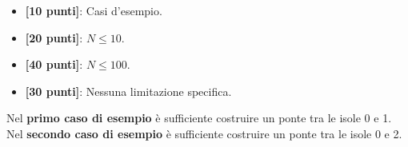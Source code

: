 \begin{itemize}[nolistsep,itemsep=2mm]
  \item \textbf{ [10 punti]}: Casi d'esempio.
  \item \textbf{ [20 punti]}: $N \leq 10$.
  \item \textbf{ [40 punti]}: $N \leq 100$.
  \item \textbf{ [30 punti]}: Nessuna limitazione specifica.
\end{itemize}

\Examples
\begin{example}
%
\end{example}
\begin{example}
%
\end{example}


\Explanation
Nel \textbf{primo caso di esempio} è sufficiente costruire un ponte tra le isole 0 e 1.\\[2mm]
Nel \textbf{secondo caso di esempio} è sufficiente costruire un ponte tra le isole 0 e 2.